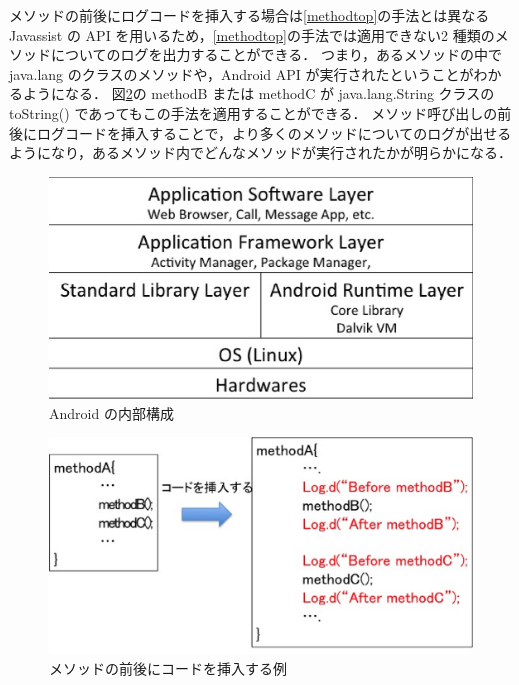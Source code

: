 メソッドの前後にログコードを挿入する場合は\ref{methodtop}の手法とは異なる Javassist の API を用いるため，\ref{methodtop}の手法では適用できない2 種類のメソッドについてのログを出力することができる．
つまり，あるメソッドの中で java.lang のクラスのメソッドや，Android API が実行されたということがわかるようになる．
図\ref{insertbetw}の methodB または methodC が java.lang.String  クラスの toString() であってもこの手法を適用することができる．
メソッド呼び出しの前後にログコードを挿入することで，より多くのメソッドについてのログが出せるようになり，あるメソッド内でどんなメソッドが実行されたかが明らかになる．

\begin{figure}[t]
\begin{center}
\graphicspath{{./epsfiles/}}
\includegraphics[scale=0.4]{structure2.eps}
\end{center}
\caption{Android の内部構成}
\label{structure}
\end{figure}

\begin{figure}[t]
\begin{center}
\graphicspath{{./epsfiles/}}
\includegraphics[scale=0.35]{image4.eps}
\end{center}
\caption{メソッドの前後にコードを挿入する例}
\label{insertbetw}
\end{figure}


